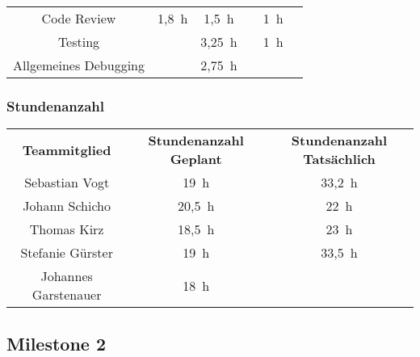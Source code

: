 \begin{landscape}
\begin{center}
\begin{tabular}{ c c c c c c }
			Code Review & 1,8~h & 1,5~h & & 1~h & \\
			
			Testing & & 3,25~h & & 1~h & \\
			
			Allgemeines Debugging & & 2,75~h & & &
		\end{tabular}
	\end{center}
	
	\subsubsection{Stundenanzahl}
	\begin{center}
		\begin{tabular}{ c c c }
			\textbf{Teammitglied} & \textbf{Stundenanzahl Geplant} & \textbf{Stundenanzahl Tatsächlich}\\
			Sebastian Vogt & 19~h & 33,2~h \\
			Johann Schicho & 20,5~h & 22~h \\
			Thomas Kirz & 18,5~h & 23~h \\
			Stefanie Gürster & 19~h & 33,5~h \\
			Johannes Garstenauer & 18~h & 
		\end{tabular}
	\end{center}
	
	\subsection{Milestone 2}

\end{landscape}
